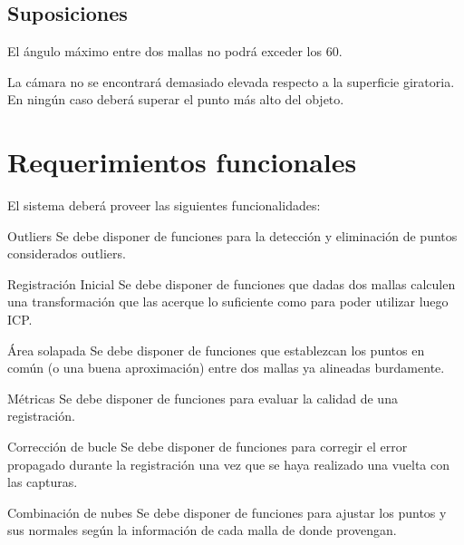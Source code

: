 



		\subsection{Suposiciones}
			El ángulo máximo entre dos mallas no podrá exceder los 60\textdegree.

			La cámara no se encontrará demasiado elevada respecto a la
			superficie giratoria. En ningún caso deberá superar el punto más alto del objeto.

	\section{Requerimientos funcionales}
		El sistema deberá proveer las siguientes funcionalidades:

		\Requerimiento
			{Outliers}
			{Se debe disponer de funciones para la detección y eliminación de
			puntos considerados outliers.}

		\Requerimiento
			{Registración Inicial}
			{Se debe disponer de funciones que dadas dos mallas calculen una
			transformación que las acerque lo suficiente como para poder
			utilizar luego ICP.}

		\Requerimiento
			{Área solapada}
			{Se debe disponer de funciones que establezcan los puntos en común (o una buena
			aproximación) entre dos mallas ya alineadas burdamente.}

		\Requerimiento
			{Métricas}
			{Se debe disponer de funciones para evaluar la calidad de una registración.}

		\Requerimiento
			{Corrección de bucle}
			{Se debe disponer de funciones para corregir el error propagado durante la registración
			una vez que se haya realizado una vuelta con las capturas.}

		\Requerimiento
			{Combinación de nubes}
			{Se debe disponer de funciones para ajustar los puntos y sus normales según la
			información de cada malla de donde provengan.}

